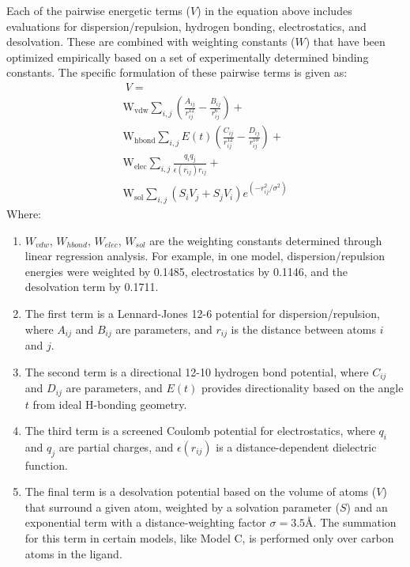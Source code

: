 \documentclass[11pt]{article}
\begin{document}
Each of the pairwise energetic terms ($V$) in the equation above includes evaluations for dispersion/repulsion, hydrogen bonding, electrostatics, and desolvation. These are combined with weighting constants ($W$) that have been optimized empirically based on a set of experimentally determined binding constants.
The specific formulation of these pairwise terms is given as:
\begin{equation} \label{eq:AUTODOCKscore-2}
\begin{split}
    \ V =  \\ 
        \text{W}_{\text{vdw}} \sum_{i,j} \left( \frac{A_{ij}}{r_{ij}^{12}} - \frac{B_{ij}}{r_{ij}^{6}} \right) + \\
        \text{W}_{\text{hbond}} \sum_{i,j} E(t) \left( \frac{C_{ij}}{r_{ij}^{12}} - \frac{D_{ij}}{r_{ij}^{10}} \right) + \\
        \text{W}_{\text{elec}} \sum_{i,j} \frac{q_i q_j}{\epsilon(r_{ij})r_{ij}} +  \\
        \text{W}_{\text{sol}} \sum_{i,j} (S_i V_j + S_j V_i) e^{(-r_{ij}^2 / \sigma^2)}
\end{split}
\end{equation}
Where:
\begin{enumerate}
    \item $W_{vdw}$, $W_{hbond}$, $W_{elec}$, $W_{sol}$ are the weighting constants determined through linear regression analysis. For example, in one model, dispersion/repulsion energies were weighted by 0.1485, electrostatics by 0.1146, and the desolvation term by 0.1711.
    \item The first term is a Lennard-Jones 12-6 potential for dispersion/repulsion, where $A_{ij}$ and $B_{ij}$ are parameters, and $r_{ij}$ is the distance between atoms $i$ and $j$.
    \item The second term is a directional 12-10 hydrogen bond potential, where $C_{ij}$ and $D_{ij}$ are parameters, and $E(t)$ provides directionality based on the angle $t$ from ideal H-bonding geometry.
    \item The third term is a screened Coulomb potential for electrostatics, where $q_i$ and $q_j$ are partial charges, and $\epsilon(r_{ij})$ is a distance-dependent dielectric function.
    \item The final term is a desolvation potential based on the volume of atoms ($V$) that surround a given atom, weighted by a solvation parameter ($S$) and an exponential term with a distance-weighting factor $\sigma = 3.5${\AA}. The summation for this term in certain models, like Model C, is performed only over carbon atoms in the ligand.
\end{enumerate}
\end{document}
